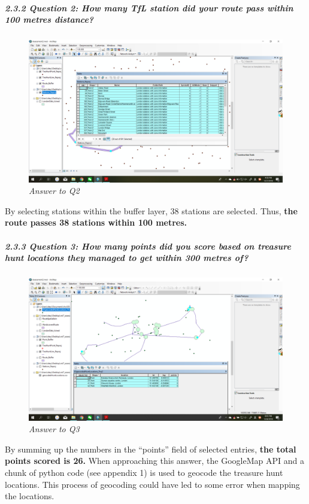 \documentclass[]{article}
\let\oldsubparagraph\subparagraph
\renewcommand{\subparagraph}[1]{\oldsubparagraph{#1}\mbox{}}
\begin{document}
\subparagraph{2.3.2 Question 2: How many TfL station did your route pass
within 100 metres
distance?}\label{question-2-how-many-tfl-station-did-your-route-pass-within-100-metres-distance}

\begin{figure}
\centering
\includegraphics{Part2/pngs/Q2.png}
\caption{\emph{Answer to Q2}}
\end{figure}

By selecting stations within the buffer layer, 38 stations are selected.
Thus, \textbf{the route passes 38 stations within 100 metres.}

\subparagraph{2.3.3 Question 3: How many points did you score based on
treasure hunt locations they managed to get within 300 metres
of?}\label{question-3-how-many-points-did-you-score-based-on-treasure-hunt-locations-they-managed-to-get-within-300-metres-of}

\begin{figure}
\centering
\includegraphics{Part2/pngs/Q5.png}
\caption{\emph{Answer to Q3}}
\end{figure}

By summing up the numbers in the ``points'' field of selected entries,
\textbf{the total points scored is 26.} When approaching this answer,
the GoogleMap API and a chunk of python code (see appendix 1) is used to
geocode the treasure hunt locations. This process of geocoding could
have led to some error when mapping the locations.
\end{document}
